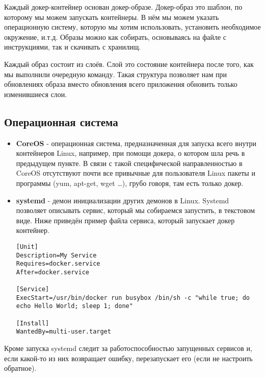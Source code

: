 	Каждый докер-контейнер основан докер-образе. Докер-образ это шаблон, по которому мы можем запускать контейнеры. В нём мы можем указать операционную систему, которую мы хотим использовать, установить необходимое окружение, и.т.д. Образы можно как собирать, основываясь на файле с инструкциями, так и скачивать с хранилищ.
	
	Каждый образ состоит из слоёв. Слой это состояние контейнера после того, как мы выполнили очередную команду. Такая структура позволяет нам при обновлениях образа вместо обновления всего приложения обновить только изменившиеся слои.
\subsection{Операционная система}
\begin{itemize}

	\item {\bf CoreOS} - операционная система, предназначенная для запуска всего внутри контейнеров Linux, например, при помощи докера, о котором шла речь в предыдущем пункте. В связи с такой специфической направленностью в CoreOS отсутствуют почти все привычные для пользователя Linux пакеты и программы (yum, apt-get, wget \dots), грубо говоря, там есть только докер.
	
	\item {\bf systemd} - демон инициализации других демонов в Linux. Systemd позволяет описывать сервис, который мы собираемся запустить, в текстовом виде. Ниже приведён пример файла сервиса, который запускает докер контейнер.
\begin{lstlisting}
[Unit]
Description=My Service
Requires=docker.service
After=docker.service

[Service]	
ExecStart=/usr/bin/docker run busybox /bin/sh -c "while true; do echo Hello World; sleep 1; done"

[Install]
WantedBy=multi-user.target
\end{lstlisting}
\end{itemize}
	Кроме запуска systemd следит за работоспособностью запущенных сервисов и, если какой-то из них возвращает ошибку, перезапускает его (если не настроить обратное).
